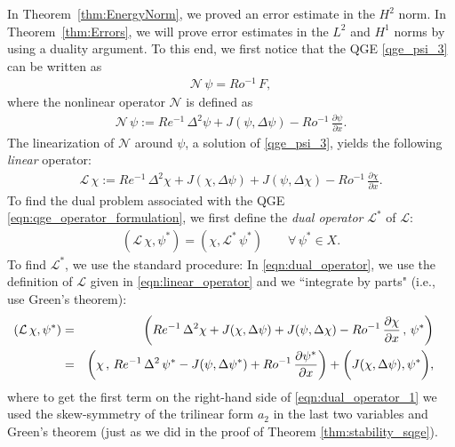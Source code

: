 In Theorem~\ref{thm:EnergyNorm}, we proved an error estimate in the $H^2$ norm.
In Theorem~\ref{thm:Errors}, we will prove error estimates in the $L^2$ and $H^1$ norms by using a duality argument.
To this end, we first notice that the QGE \eqref{qge_psi_3} can be written as
\begin{eqnarray}
\mathcal{N} \, \psi
= Ro^{-1} \, F ,
\label{eqn:qge_operator_formulation}
\end{eqnarray}
where the nonlinear operator $\mathcal{N}$ is defined as
\begin{eqnarray}
\mathcal{N} \, \psi
:= Re^{-1} \, \Delta^2 \psi 
+ J(\psi , \Delta \psi)
- Ro^{-1} \, \frac{\partial \psi}{\partial x} .
\label{eqn:nonlinear_operator}
\end{eqnarray}
The linearization of $\mathcal{N}$ around $\psi$, a solution of \eqref{qge_psi_3}, yields the following \emph{linear} operator:
\begin{eqnarray}
\mathcal{L} \, \chi
:= Re^{-1} \, \Delta^2 \chi 
+ J(\chi , \Delta \psi)
+ J(\psi, \Delta \chi)
- Ro^{-1} \, \frac{\partial \chi}{\partial x} .
\label{eqn:linear_operator}
\end{eqnarray}
To find the dual problem associated with the QGE \eqref{eqn:qge_operator_formulation}, we first define the \emph{dual operator} $\mathcal{L}^*$ of $\mathcal{L}$:
\begin{eqnarray}
(\mathcal{L} \, \chi , \psi^*)
= ( \chi , \mathcal{L}^* \, \psi^*)
\qquad 
\forall \, \psi^* \in X .
\label{eqn:dual_operator}
\end{eqnarray}
To find $\mathcal{L}^*$, we use the standard procedure: 
In \eqref{eqn:dual_operator}, we use the definition of $\mathcal{L}$ given in \eqref{eqn:linear_operator} and we ``integrate by parts" (i.e., use Green's theorem):
\begin{eqnarray}
\hspace*{-0.4cm}
(\mathcal{L} \, \chi , \psi^*)
&=& \left( 
Re^{-1} \, \Delta^2 \chi 
+ J(\chi , \Delta \psi)
+ J(\psi, \Delta \chi)
- Ro^{-1} \, \frac{\partial \chi}{\partial x} 
\, , \, \psi^*
\right) 
\nonumber \\
&=& \left( 
\chi \, , \, 
Re^{-1} \, \Delta^2 \, \psi^*
- J(\psi , \Delta \psi^* )
+ Ro^{-1} \, \frac{\partial \psi^*}{\partial x} 
\right)
+ \biggl( J(\chi , \Delta \psi) , \psi^* \biggr) ,
\label{eqn:dual_operator_1}
\end{eqnarray}
where to get the first term on the right-hand side of \eqref{eqn:dual_operator_1} we used the skew-symmetry of the trilinear form $a_2$ in the last two variables and Green's theorem (just as we did in the proof of Theorem \ref{thm:stability_sqge}).
